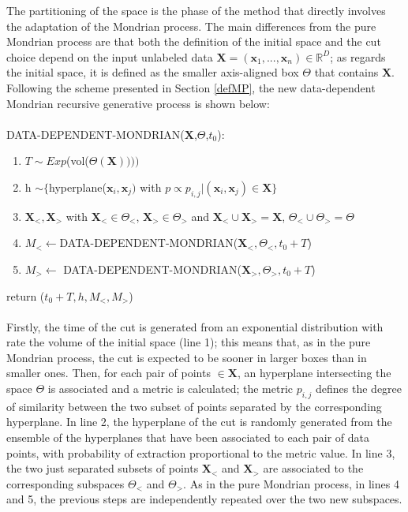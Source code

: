 \documentclass[a4paper]{article}
\begin{document}
The partitioning of the space is the phase of the method that directly involves the adaptation of the Mondrian process.
The main differences from the pure Mondrian process are that both the definition of the initial space and the cut choice depend on the input unlabeled data $\pmb{X} = (\pmb{x}_1,...,\pmb{x}_n) \in \mathbb{R}^D$;
as regards the initial space, it is defined as the smaller axis-aligned box $\Theta$ that contains $\pmb{X}$.\\
Following the scheme presented in Section \ref{defMP}, the new data-dependent Mondrian recursive generative process is shown below:\\ \\ 
DATA-DEPENDENT-MONDRIAN($\pmb{X}$,$\Theta$,$t_0$):%
\begin{enumerate}[nolistsep]
\item $T \sim Exp$(vol($\Theta(\pmb{X}))))$  
\item h $\sim \{$hyperplane($\pmb{x}_i,\pmb{x}_j)$ with $p \propto p_{i,j} \lvert (\pmb{x}_i,\pmb{x}_j) \in \pmb{X}\}$
\item $\pmb{X}_<,\pmb{X}_>$ with $\pmb{X}_< \in \Theta_<$, $\pmb{X}_> \in \Theta_>$ and $\pmb{X}_< \cup \pmb{X}_> = \pmb{X}$, $\Theta_< \cup \Theta_> = \Theta$
\item $M_< \leftarrow$DATA-DEPENDENT-MONDRIAN($\pmb{X}_<,\Theta_<,t_0+T$) 
\item $M_> \leftarrow$ DATA-DEPENDENT-MONDRIAN($\pmb{X}_>,\Theta_>,t_0+T$) 
\end{enumerate}
return ($t_0+T,h,M_<,M_>$)\\ \\%
Firstly, the time of the cut is generated from an exponential distribution with rate the volume of the initial space (line 1);
this means that, as in the pure Mondrian process, the cut is expected to be sooner in larger boxes than in smaller ones.
Then, for each pair of points $\in \pmb{X}$, an hyperplane intersecting the space $\Theta$ is associated and a metric is calculated;
the metric $p_{i,j}$ defines the degree of similarity between the two subset of points separated by the corresponding hyperplane.
In line 2, the hyperplane of the cut is randomly generated from the ensemble of the hyperplanes that have been associated to each pair of data points, with probability of extraction proportional to the metric value.
In line 3, the two just separated subsets of points $\pmb{X}_<$ and $\pmb{X}_>$ are associated to the corresponding subspaces $\Theta_<$ and $\Theta_>$. 
As in the pure Mondrian process, in lines 4 and 5, the previous steps are independently repeated over the two new subspaces.
\end{document}
